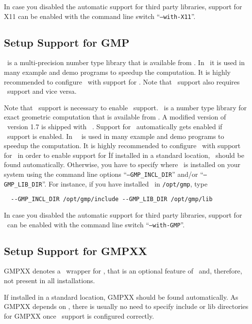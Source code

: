 In case you disabled the automatic support for third party libraries,
support for X11 can be enabled with the command line switch
``\texttt{--with-X11}''.

\subsection{Setup Support for GMP\label{sec:gmp-setup}}

\gmp\ is a multi-precision number type library that is available from
\gmppage. In \cgal\ it is used in many example and demo programs to
speedup the computation. It is highly recommended to configure \cgal\
with support for \gmp. Note that \gmp\ support also requires \mpfr\
support and vice versa.

Note that \gmp\ support is necessary to enable \core\ support.
\core\ is a number type library for exact geometric computation that
is available from \corepage. A modified version of \core\ version 1.7
is shipped with \cgal~\cgalrelease. Support for \core\ automatically
gets enabled if \gmp\ support is enabled. In \cgal\, \core\ is used
in many example and demo programs to speedup the computation. It is
highly recommended to configure \cgal\ with support for \gmp\ in order
to enable support for \core\.

If installed in a standard location, \gmp\ should be
found automatically. Otherwise, you have to specify where \gmp\ is
installed on your system using the command line options
``\texttt{--GMP\_INCL\_DIR}'' and/or ``\texttt{--GMP\_LIB\_DIR}''. For
instance, if you have installed \gmp\ in \texttt{/opt/gmp}, type
\begin{verbatim}
  --GMP_INCL_DIR /opt/gmp/include --GMP_LIB_DIR /opt/gmp/lib
\end{verbatim}

In case you disabled the automatic support for third party libraries,
support for \gmp\ can be enabled with the command line switch
``\texttt{--with-GMP}''.

\subsection{Setup Support for GMPXX\label{sec:gmpxx-setup}}

GMPXX denotes a \CC\ wrapper for \gmp, that is an optional feature of
\gmp\ and, therefore, not present in all installations.

If installed in a standard location, GMPXX should be found
automatically. As GMPXX depends on \gmp, there is usually no need to
specify include or lib directories for GMPXX once \gmp\ support is
configured correctly.

